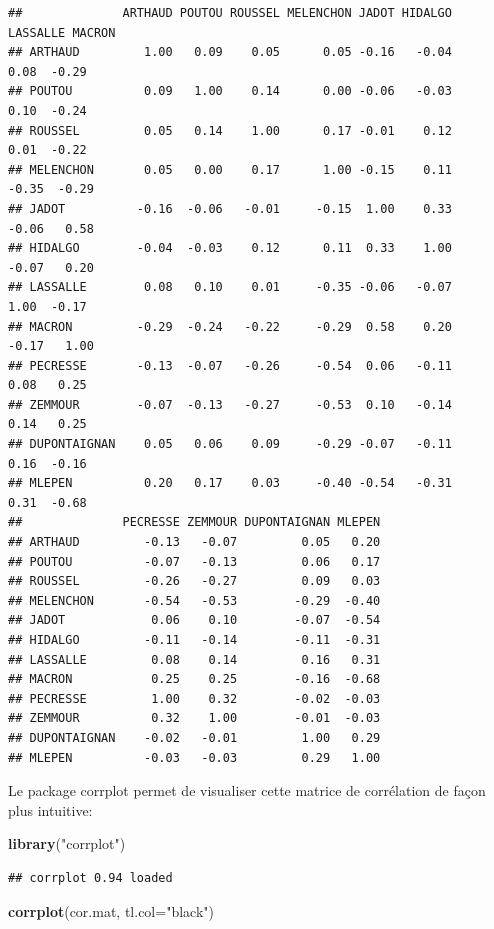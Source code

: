 \documentclass[
]{book}
\newenvironment{Shaded}{\begin{snugshade}}{\end{snugshade}}
\newcommand{\AttributeTok}[1]{\textcolor[rgb]{0.13,0.29,0.53}{#1}}
\newcommand{\FunctionTok}[1]{\textcolor[rgb]{0.13,0.29,0.53}{\textbf{#1}}}
\newcommand{\NormalTok}[1]{#1}
\newcommand{\StringTok}[1]{\textcolor[rgb]{0.31,0.60,0.02}{#1}}
\begin{document}
\begin{verbatim}
##              ARTHAUD POUTOU ROUSSEL MELENCHON JADOT HIDALGO LASSALLE MACRON
## ARTHAUD         1.00   0.09    0.05      0.05 -0.16   -0.04     0.08  -0.29
## POUTOU          0.09   1.00    0.14      0.00 -0.06   -0.03     0.10  -0.24
## ROUSSEL         0.05   0.14    1.00      0.17 -0.01    0.12     0.01  -0.22
## MELENCHON       0.05   0.00    0.17      1.00 -0.15    0.11    -0.35  -0.29
## JADOT          -0.16  -0.06   -0.01     -0.15  1.00    0.33    -0.06   0.58
## HIDALGO        -0.04  -0.03    0.12      0.11  0.33    1.00    -0.07   0.20
## LASSALLE        0.08   0.10    0.01     -0.35 -0.06   -0.07     1.00  -0.17
## MACRON         -0.29  -0.24   -0.22     -0.29  0.58    0.20    -0.17   1.00
## PECRESSE       -0.13  -0.07   -0.26     -0.54  0.06   -0.11     0.08   0.25
## ZEMMOUR        -0.07  -0.13   -0.27     -0.53  0.10   -0.14     0.14   0.25
## DUPONTAIGNAN    0.05   0.06    0.09     -0.29 -0.07   -0.11     0.16  -0.16
## MLEPEN          0.20   0.17    0.03     -0.40 -0.54   -0.31     0.31  -0.68
##              PECRESSE ZEMMOUR DUPONTAIGNAN MLEPEN
## ARTHAUD         -0.13   -0.07         0.05   0.20
## POUTOU          -0.07   -0.13         0.06   0.17
## ROUSSEL         -0.26   -0.27         0.09   0.03
## MELENCHON       -0.54   -0.53        -0.29  -0.40
## JADOT            0.06    0.10        -0.07  -0.54
## HIDALGO         -0.11   -0.14        -0.11  -0.31
## LASSALLE         0.08    0.14         0.16   0.31
## MACRON           0.25    0.25        -0.16  -0.68
## PECRESSE         1.00    0.32        -0.02  -0.03
## ZEMMOUR          0.32    1.00        -0.01  -0.03
## DUPONTAIGNAN    -0.02   -0.01         1.00   0.29
## MLEPEN          -0.03   -0.03         0.29   1.00
\end{verbatim}

Le package corrplot permet de visualiser cette matrice de corrélation de façon plus intuitive:

\begin{Shaded}
\begin{Highlighting}[]
\FunctionTok{library}\NormalTok{(}\StringTok{"corrplot"}\NormalTok{)}
\end{Highlighting}
\end{Shaded}

\begin{verbatim}
## corrplot 0.94 loaded
\end{verbatim}

\begin{Shaded}
\begin{Highlighting}[]
\FunctionTok{corrplot}\NormalTok{(cor.mat, }\AttributeTok{tl.col=}\StringTok{"black"}\NormalTok{)}
\end{Highlighting}
\end{Shaded}
\end{document}
